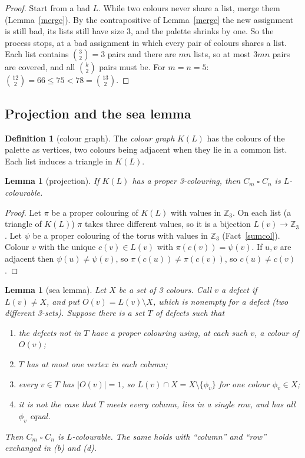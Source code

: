 \documentclass[11pt]{article}
\theoremstyle{plain}
\newtheorem{lemma}[theorem]{Lemma}
\theoremstyle{definition}
\newtheorem{definition}[theorem]{Definition}
\theoremstyle{remark}
\newcommand{\T}{\mathbin{\square}}
\newcommand{\Z}{\mathbb{Z}}
\newcommand{\sm}{\setminus}
\begin{document}
\begin{proof}
Start from a bad $L$. While two colours never share a list, merge them (Lemma~\ref{merge}). By the contrapositive
of Lemma~\ref{merge} the new assignment is still bad, its lists still have size 3, and the palette shrinks by one.
So the process stops, at a bad assignment in which every pair of colours shares a list. Each list contains
$\binom32 = 3$ pairs and there are $mn$ lists, so at most $3mn$ pairs are covered, and all $\binom{k}{2}$ pairs must be.
For $m = n = 5$: $\binom{12}{2} = 66 \le 75 < 78 = \binom{13}{2}$.
\end{proof}

\subsection{Projection and the sea lemma}

\begin{definition}[colour graph]
The \emph{colour graph} $K(L)$ has the colours of the palette as vertices, two colours being adjacent when they lie in a
common list. Each list induces a triangle in $K(L)$.
\end{definition}

\begin{lemma}[projection]\label{projection}
If $K(L)$ has a proper 3-colouring, then $C_m \T C_n$ is $L$-colourable.
\end{lemma}

\begin{proof}
Let $\pi$ be a proper colouring of $K(L)$ with values in $\Z_3$. On each list (a triangle of $K(L)$) $\pi$ takes three
different values, so it is a bijection $L(v) \to \Z_3$. Let $\psi$ be a proper colouring of the torus with values in
$\Z_3$ (Fact~\ref{sumcol}). Colour $v$ with the unique $c(v) \in L(v)$ with $\pi(c(v)) = \psi(v)$. If $u, v$ are
adjacent then $\psi(u) \ne \psi(v)$, so $\pi(c(u)) \ne \pi(c(v))$, so $c(u) \ne c(v)$.
\end{proof}

\begin{lemma}[sea lemma]\label{sea}
Let $X$ be a set of 3 colours. Call $v$ a \emph{defect} if $L(v) \ne X$, and put $O(v) = L(v) \sm X$, which is nonempty
for a defect (two different 3-sets). Suppose there is a set $T$ of defects such that
\begin{enumerate}[label=(\alph*),nosep]
\item the defects not in $T$ have a proper colouring using, at each such $v$, a colour of $O(v)$;
\item $T$ has at most one vertex in each column;
\item every $v \in T$ has $|O(v)| = 1$, so $L(v) \cap X = X \sm \{\phi_v\}$ for one colour $\phi_v \in X$;
\item it is not the case that $T$ meets every column, lies in a single row, and has all $\phi_v$ equal.
\end{enumerate}
Then $C_m \T C_n$ is $L$-colourable. The same holds with ``column'' and ``row'' exchanged in (b) and (d).
\end{lemma}
\end{document}

